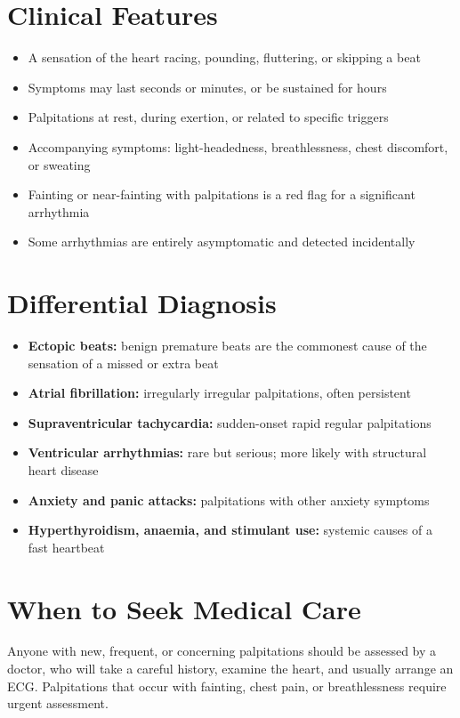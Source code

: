 \section*{Clinical Features}
\begin{itemize}
    \item A sensation of the heart racing, pounding, fluttering, or skipping a beat
    \item Symptoms may last seconds or minutes, or be sustained for hours
    \item Palpitations at rest, during exertion, or related to specific triggers
    \item Accompanying symptoms: light-headedness, breathlessness, chest discomfort, or sweating
    \item Fainting or near-fainting with palpitations is a red flag for a significant arrhythmia
    \item Some arrhythmias are entirely asymptomatic and detected incidentally
\end{itemize}

\section*{Differential Diagnosis}
\begin{itemize}
    \item \textbf{Ectopic beats:} benign premature beats are the commonest cause of the sensation of a missed or extra beat
    \item \textbf{Atrial fibrillation:} irregularly irregular palpitations, often persistent
    \item \textbf{Supraventricular tachycardia:} sudden-onset rapid regular palpitations
    \item \textbf{Ventricular arrhythmias:} rare but serious; more likely with structural heart disease
    \item \textbf{Anxiety and panic attacks:} palpitations with other anxiety symptoms
    \item \textbf{Hyperthyroidism, anaemia, and stimulant use:} systemic causes of a fast heartbeat
\end{itemize}

\section*{When to Seek Medical Care}
Anyone with new, frequent, or concerning palpitations should be assessed by a doctor, who will take a careful history, examine the heart, and usually arrange an ECG. Palpitations that occur with fainting, chest pain, or breathlessness require urgent assessment.

